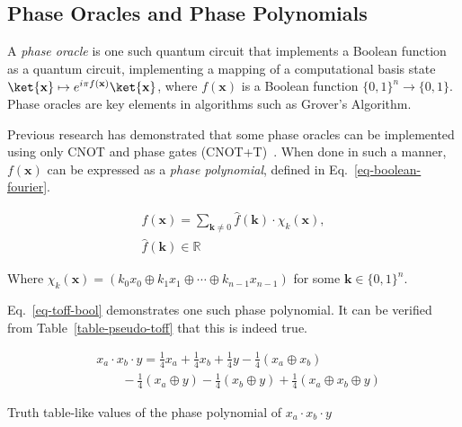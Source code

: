 \subsection{Phase Oracles and Phase Polynomials}
\label{Pre:oracle}
A {\it phase oracle} is one such quantum circuit that implements a Boolean function as a
quantum circuit, implementing a mapping of a computational basis state
$\ket{\mathbf{x}} \mapsto e^{i \pi f(\mathbf{x})}\ket{\mathbf{x}}$, where $f(\mathbf{x})$
is a Boolean function $\{0,1\}^n \rightarrow \{0,1\}$. Phase oracles are key elements in
algorithms such as Grover's Algorithm.

Previous research has demonstrated that some phase oracles can be implemented using only
CNOT and phase gates
(CNOT+T)~\cite{bib-amy-cnot}. When done in such a manner, $f(\mathbf{x})$ can be expressed
as a {\it phase polynomial},
defined in Eq.~\ref{eq-boolean-fourier}.

\begin{equation}
  \begin{aligned}
    \label{eq-boolean-fourier}
    f(\mathbf{x}) = \sum_{\mathbf{k} \neq 0} \hat{f}(\mathbf{k}) \cdot \chi_k(\mathbf{x}), \\\nonumber
    \hat{f}(\mathbf{k}) \in \mathbb{R}
  \end{aligned}
\end{equation}

Where $\chi_k(\mathbf{x}) = ( k_0 x_0 \oplus k_1 x_1 \oplus \cdots \oplus k_{n-1} x_{n-1})$
for some $\mathbf{k} \in \{0,1\}^{n}$.

Eq.~\ref{eq-toff-bool} demonstrates one such phase polynomial. It can be verified from
Table~\ref{table-pseudo-toff} that this is indeed true.

\begin{equation}
  \label{eq-toff-bool}
  \begin{aligned}
    &x_a \cdot x_b \cdot y = \frac{1}{4}x_a + \frac{1}{4}x_b + \frac{1}{4}y - \frac{1}{4}(x_a \oplus x_b) \\
    &\qquad -\frac{1}{4}(x_a \oplus y) - \frac{1}{4}(x_b \oplus y) + \frac{1}{4}(x_a \oplus x_b \oplus y)
  \end{aligned}
\end{equation}

\def\arraystretch{1.3}
\begin{table*}[h]
  \begin{minipage}{\textwidth}
    \begin{center}
      \scalebox{1.0} {
        
      }
      \caption{Truth table-like values of the phase polynomial of $x_a \cdot x_b \cdot y$}
      \label{table-pseudo-toff}
    \end{center}
  \end{minipage}
\end{table*}
\def\arraystretch{1.1}

